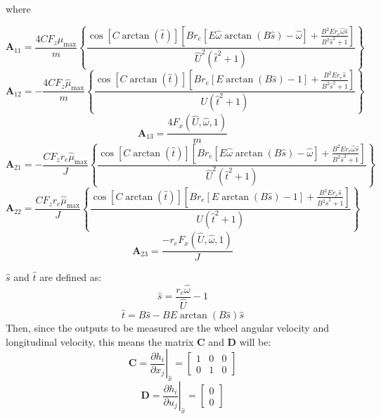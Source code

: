 \documentclass[letterpaper,12pt]{article}
\begin{document}
\begin{center}
where
\end{center}
\begin{equation*}
\mathbf{A}_{11} = \frac{4 C F_z \hat{\mu}_{\max}}{m} \left\{\frac{\cos\left[C\arctan\left(\hat{t}\right)\right]\left[B r_e  \left[E\hat{\omega} \arctan\left(B\hat{s}\right)- \hat{\omega}\right]+\frac{B^2 E r_e\hat{\omega} \hat{s}}{B^2 {\hat{s}}^2+1}\right]}{\hat{U}^2\left(\hat{t}^2+1\right)}\right\}
\end{equation*}
\begin{equation*}
\mathbf{A}_{12} = - \frac{4 C F_z \hat{\mu}_{\max}}{m} \left\{\frac{\cos\left[C\arctan\left(\hat{t}\right)\right]\left[B r_e \left[ E \arctan\left(B \hat{s} \right)-1 \right]+\frac{B^2 E r_e \hat{s}}{B^2{\hat{s}}^2+1}\right]}{U\left(\hat{t}^2+1\right)}\right\}
\end{equation*}
\begin{equation*}
\mathbf{A}_{13} = \frac{4F_x (\hat{U},\hat{\omega},1)}{m}
\end{equation*}
\begin{equation*}
\mathbf{A}_{21} = - \frac{C F_z r_e \hat{\mu}_{\max}}{J}\left\{\frac{\cos\left[C\arctan\left(\hat{t}\right)\right]\left[B r_e  \left[E\hat{\omega} \arctan\left(B\hat{s}\right)- \hat{\omega}\right]+\frac{B^2 E r_e\hat{\omega} \hat{s}}{B^2 {\hat{s}}^2+1}\right]}{\hat{U}^2\left(\hat{t}^2+1\right)}\right\}
\end{equation*}
\begin{equation*}
\mathbf{A}_{22} = \frac{C F_z r_e \hat{\mu}_{\max}}{J} \left\{\frac{\cos\left[C\arctan\left(\hat{t}\right)\right]\left[B r_e \left[ E \arctan\left(B \hat{s} \right)-1 \right]+\frac{B^2 E r_e \hat{s}}{B^2{\hat{s}}^2+1}\right]}{U\left(\hat{t}^2+1\right)}\right\}
\end{equation*}
\begin{equation*}
\mathbf{A}_{23} = \frac{-r_e F_x (\hat{U},\hat{\omega},1) }{J}
\end{equation*}
\par
$\hat{s}$ and $\hat{t}$ are defined as:
\begin{equation*}
\hat{s} = \frac{r_e\hat{\omega}}{\hat{U}}-1
\end{equation*}
\begin{equation*}
\hat{t} = B\hat{s}-BE\arctan\left(B\hat{s}\right)\hat{s}
\end{equation*}
\newpage
Then, since the outputs to be measured are the wheel angular velocity and longitudinal velocity, this means the matrix $\mathbf{C}$ and $\mathbf{D}$ will be:
\begin{equation*}
\mathbf{C} = \left.\frac{\partial h_i}{\partial x_j}\right|_{\hat{x}} =
\left[
\begin{array}{ccc}
1 & 0 & 0 \\
0 & 1 & 0
\end{array}
\right]
\end{equation*}
\begin{equation*}
\mathbf{D} = \left.\frac{\partial h_i}{\partial u_j}\right|_{\hat{x}} =
\left[
\begin{array}{c}
0 \\
0
\end{array}
\right]
\end{equation*}
\end{document}
